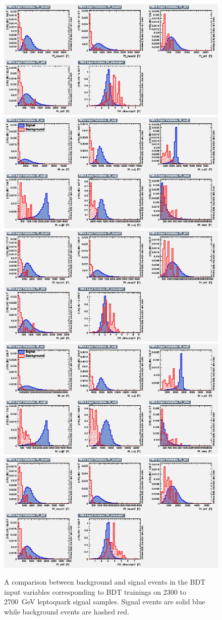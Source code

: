 \begin{figure}[H]
    {\includegraphics[width=.49\textwidth]{Images/Analysis/Results_LQToBMu_pair_uubj_BDTG_FullRun2_2023_01_25_020318/2500/variables_id_c2.png}}
    {\includegraphics[width=.49\textwidth]{Images/Analysis/Results_LQToBMu_pair_uubj_BDTG_FullRun2_2023_01_25_020318/2600/variables_id_c1.png}}
    {\includegraphics[width=.49\textwidth]{Images/Analysis/Results_LQToBMu_pair_uubj_BDTG_FullRun2_2023_01_25_020318/2600/variables_id_c2.png}}
    {\includegraphics[width=.49\textwidth]{Images/Analysis/Results_LQToBMu_pair_uubj_BDTG_FullRun2_2023_01_25_020318/2700/variables_id_c1.png}}
    {\includegraphics[width=.49\textwidth]{Images/Analysis/Results_LQToBMu_pair_uubj_BDTG_FullRun2_2023_01_25_020318/2700/variables_id_c2.png}}
    \caption{A comparison between background and signal events in the BDT input variables corresponding to BDT trainings on 2300 to \SI{2700}{GeV} leptoquark signal samples. Signal events are solid blue while background events are hashed red.}
    \label{figapp:variables5}
\end{figure}

